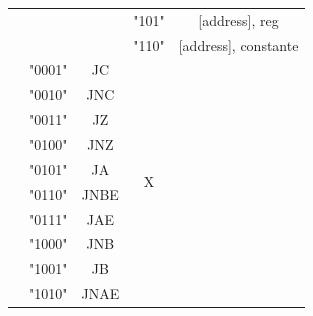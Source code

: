 \documentclass[12pt]{article}
\begin{document}
\begin{table}[!htbp]
\begin{tabular}{|c|c|c|c|c}
                    &                         &                      & "101"                  & \multicolumn{1}{c|}{{[}address{]}, reg}                 \\ \cline{4-5} 
                    &                         &                      & "110"                  & \multicolumn{1}{c|}{{[}address{]}, constante}           \\ \cline{2-5} 
                    & "0001"                  & JC                   & \multirow{14}{*}{X}    & \multicolumn{1}{c|}{}                                   \\ \cline{2-3} \cline{5-5} 
                    & "0010"                  & JNC                  &                        & \multicolumn{1}{c|}{}                                   \\ \cline{2-3} \cline{5-5} 
                    & "0011"                  & JZ                   &                        & \multicolumn{1}{c|}{}                                   \\ \cline{2-3} \cline{5-5} 
                    & "0100"                  & JNZ                  &                        & \multicolumn{1}{c|}{}                                   \\ \cline{2-3} \cline{5-5} 
                    & "0101"                  & JA                   &                        & \multicolumn{1}{c|}{}                                   \\ \cline{2-3} \cline{5-5} 
                    & "0110"                  & JNBE                 &                        & \multicolumn{1}{c|}{}                                   \\ \cline{2-3} \cline{5-5} 
                    & "0111"                  & JAE                  &                        & \multicolumn{1}{c|}{}                                   \\ \cline{2-3} \cline{5-5} 
                    & "1000"                  & JNB                  &                        & \multicolumn{1}{c|}{}                                   \\ \cline{2-3} \cline{5-5} 
                    & "1001"                  & JB                   &                        & \multicolumn{1}{c|}{}                                   \\ \cline{2-3} \cline{5-5} 
                    & "1010"                  & JNAE                 &                        & \multicolumn{1}{c|}{}                                   \\ \cline{2-3} \cline{5-5} 

\end{tabular}
\end{table}
\end{document}
